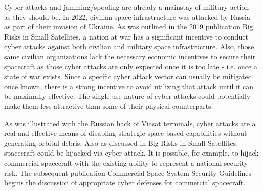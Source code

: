 Cyber attacks and jamming/spoofing are already a mainstay of military
action - as they should be.  In 2022, civilian space infrastructure
was attacked by Russia as part of their invasion of Ukraine.  As was
outlined in the 2019 publication Big Risks in Small Satellites, a
nation at war has a significant incentive to conduct cyber attacks
against both civilian and military space infrastructure.  Also, those
same civilian organizations lack the necessary economic incentives to
secure their spacecraft as those cyber attacks are only expected once
it is too late - i.e. once a state of war exists.  Since a specific
cyber attack vector can usually be mitigated once known, there is a
strong incentive to avoid utilizing that attack until it can be
maximally effective.  The single-use nature of cyber attacks could
potentially make them less attractive than some of their physical
counterparts.

As was illustrated with the Russian hack of Viasat terminals, cyber
attacks are a real and effective means of disabling strategic
space-based capabilities without generating orbital debris.  Also as
discussed in Big Risks in Small Satellites, spacecraft could be
hijacked via cyber attack.  It is possible, for example, to hijack
commercial spacecraft with the existing ability to represent a
national security risk.  The subsequent publication Commercial Space
System Security Guidelines begins the discussion of appropriate cyber
defenses for commercial spacecraft.
